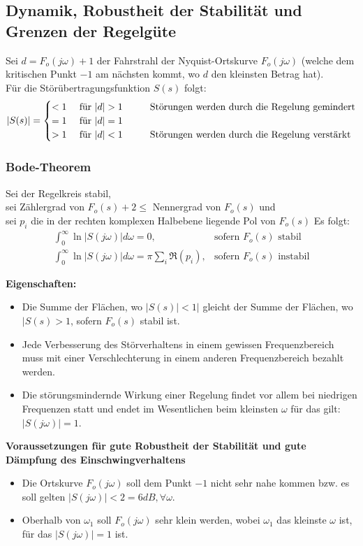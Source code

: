 \documentclass[10pt,a4paper]{article}
\newcommand{\tab}[1][1]{\hspace*{#1cm}}
\begin{document}
\subsection{Dynamik, Robustheit der Stabilität und Grenzen der Regelgüte}
Sei $d = F_o(j \omega) + 1$ der Fahrstrahl der Nyquist-Ortskurve $F_o(j \omega)$ (welche dem kritischen Punkt $-1$ am nächsten kommt, wo $d$ den kleinsten Betrag hat). \\
Für die Störübertragungsfunktion $S(s)$ folgt:
$$
	|S(s)| = \begin{cases}
		< 1 & \text{ für } |d| > 1  \tab\text{Störungen werden durch die Regelung gemindert}\\
		= 1 & \text{ für } |d| = 1 \\
		> 1 & \text{ für } |d| < 1  \tab\text{Störungen werden durch die Regelung verstärkt}\\
	\end{cases}
$$

\subsubsection{Bode-Theorem}
Sei der Regelkreis stabil, \\
sei Zählergrad von $F_o(s) + 2 ≤ $ Nennergrad von $F_o(s)$ und \\
sei $p_i$ die in der rechten komplexen Halbebene liegende Pol von $F_o(s)$
Es folgt:
$$
	\begin{array}{ll}
		\int_0^∞ \ln|S(j \omega)| d \omega = 0, & \text{sofern $F_o(s)$ stabil} \\
		\int_0^∞ \ln|S(j \omega)| d \omega = \pi \sum_i  \Re(p_i), & \text{sofern $F_o(s)$ instabil}
	\end{array}
$$

\textbf{Eigenschaften:}
\begin{itemize}
	\item Die Summe der Flächen, wo $|S(s)| < 1|$ gleicht der Summe der Flächen, wo $|S(s) > 1$, sofern $F_o(s)$ stabil ist.
	\item Jede Verbesserung des Störverhaltens in einem gewissen Frequenzbereich muss mit einer Verschlechterung in einem anderen Frequenzbereich bezahlt werden.
	\item Die störungsmindernde Wirkung einer Regelung findet vor allem bei niedrigen Frequenzen statt und endet im Wesentlichen beim kleinsten $\omega$ für das gilt: $|S(j \omega)| = 1$.
\end{itemize}

\textbf{Voraussetzungen für gute Robustheit der Stabilität und gute Dämpfung des Einschwingverhaltens}
\begin{itemize}
	\item Die Ortskurve $F_o(j \omega)$ soll dem Punkt $-1$ nicht sehr nahe kommen bzw. es soll gelten $|S(j \omega)| < 2 = 6dB, \forall \omega$.
	\item Oberhalb von $\omega_1$ soll $F_o(j \omega)$ sehr klein werden, wobei $\omega_1$ das kleinste $\omega$ ist, für das $|S(j \omega)| = 1$ ist.
\end{itemize}
\end{document}
